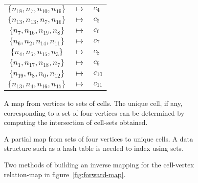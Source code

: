 \begin{figure}[H]
{\begin{tabular}{ccl}
$\{n_{18},n_{7},n_{10},n_{19}\}$ & $\mapsto$ & $c_{4}$ \\
$\{n_{13},n_{13},n_{7},n_{16}\}$ & $\mapsto$ & $c_{5}$ \\
$\{n_{7},n_{16},n_{19},n_{8}\}$ & $\mapsto$ & $c_{6}$ \\
$\{n_{6},n_{2},n_{14},n_{11}\}$ & $\mapsto$ & $c_{7}$ \\
$\{n_{4},n_{5},n_{15},n_{3}\}$ & $\mapsto$ & $c_{8}$ \\
$\{n_{1},n_{17},n_{18},n_{7}\}$ & $\mapsto$ & $c_{9}$ \\
$\{n_{19},n_{8},n_{0},n_{12}\}$ & $\mapsto$ & $c_{10}$ \\
$\{n_{13},n_{4},n_{16},n_{15}\}$ & $\mapsto$ & $c_{11}$ \\
\end{tabular}
}
\sidebysidecaptions
{\caption{A map from vertices to sets of cells. The unique cell, if any, corresponding to a set of four vertices can be determined by computing the intersection of cell-sets obtained.}}
{\caption{A partial map from sets of four vertices to unique cells. A data structure such as a hash table is needed to index using sets.}}

\caption{Two methods of building an inverse mapping for the cell-vertex relation-map in figure~\ref{fig:forward-map}.}
\label{fig:inverse-maps}
\end{figure}











